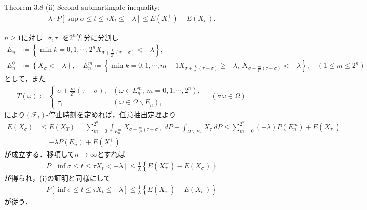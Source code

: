 	\begin{itembox}[l]{Theorem 3.8 (ii)}
		Second submartingale inequality:
		\begin{align}
			\lambda \cdot P\left[ \sup{\sigma \leq t \leq \tau}{X_t} \leq -\lambda \right]
					\leq E(X^+_\tau) - E(X_\sigma).
		\end{align}
	\end{itembox}
	
	\begin{prf}
		$n \geq 1$に対し$[\sigma,\tau]$を$2^n$等分に分割し
		\begin{align}
			E_n &\coloneqq \left\{ \min{k=0,1,\cdots,2^n}{X_{\sigma + \frac{k}{2^n}(\tau - \sigma)} < -\lambda} \right\}, \\
			E_n^0 &\coloneqq \left\{ X_\sigma < -\lambda \right\}, \quad
			E_n^m \coloneqq \left\{ \min{k=0,1,\cdots,m-1}{X_{\sigma + \frac{k}{2^n}(\tau - \sigma)}} \geq -\lambda,\ X_{\sigma + \frac{m}{2^n}(\tau - \sigma)} < -\lambda \right\},
			\quad (1 \leq m \leq 2^n)
		\end{align}
		として，また
		\begin{align}
			T(\omega) \coloneqq
			\begin{cases}
				\sigma + \frac{m}{2^n} (\tau - \sigma), & (\omega \in E_n^m,\ m=0,1,\cdots,2^n),\\
				\tau, & (\omega \in \Omega \backslash E_n),
			\end{cases}
			\quad (\forall \omega \in \Omega)
		\end{align}
		により$(\mathscr{F}_t)$-停止時刻を定めれば，任意抽出定理より
		\begin{align}
			E(X_\sigma) 
			&\leq E(X_T)
			= \sum_{m=0}^{2^n} \int_{E_n^m} X_{\sigma+\frac{m}{2^n}(\tau-\sigma)}\ dP + \int_{\Omega \backslash E_n} X_\tau\ dP
			\leq \sum_{m=0}^{2^n} (-\lambda) P(E_n^m) + E(X_\tau^+) \\
			&= -\lambda P(E_n) + E(X_\tau^+)
		\end{align}
		が成立する．移項して$n \longrightarrow \infty$とすれば
		\begin{align}
			P\left[ \inf{\sigma \leq t \leq \tau}{X_t} < -\lambda \right]
			\leq \frac{1}{\lambda} \left\{ E(X^+_\tau) - E(X_\sigma) \right\} 
		\end{align}
		が得られ，(i)の証明と同様にして
		\begin{align}
			P\left[ \inf{\sigma \leq t \leq \tau}{X_t} \leq -\lambda \right]
			\leq \frac{1}{\lambda} \left\{ E(X^+_\tau) - E(X_\sigma) \right\}
		\end{align}
		が従う．
		\QED
	\end{prf}
	
